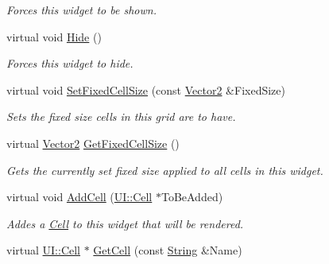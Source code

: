 \begin{DoxyCompactItemize}
\begin{DoxyCompactList}\small\item\em Forces this widget to be shown. \item\end{DoxyCompactList}\item 
\hypertarget{classphys_1_1UI_1_1CellGrid_a8f1ea23b55724f3346a6c32c87f4eabc}{
virtual void \hyperlink{classphys_1_1UI_1_1CellGrid_a8f1ea23b55724f3346a6c32c87f4eabc}{Hide} ()}
\label{d8/d59/classphys_1_1UI_1_1CellGrid_a8f1ea23b55724f3346a6c32c87f4eabc}

\begin{DoxyCompactList}\small\item\em Forces this widget to hide. \item\end{DoxyCompactList}\item 
virtual void \hyperlink{classphys_1_1UI_1_1CellGrid_ad8a6d111b1906b0eb165fcedc0917452}{SetFixedCellSize} (const \hyperlink{classphys_1_1Vector2}{Vector2} \&FixedSize)
\begin{DoxyCompactList}\small\item\em Sets the fixed size cells in this grid are to have. \item\end{DoxyCompactList}\item 
virtual \hyperlink{classphys_1_1Vector2}{Vector2} \hyperlink{classphys_1_1UI_1_1CellGrid_a7106972be4c03ac453894fcb7ef4782f}{GetFixedCellSize} ()
\begin{DoxyCompactList}\small\item\em Gets the currently set fixed size applied to all cells in this widget. \item\end{DoxyCompactList}\item 
virtual void \hyperlink{classphys_1_1UI_1_1CellGrid_ac4f29519b3e2bca1fa146b2a9a20ec61}{AddCell} (\hyperlink{classphys_1_1UI_1_1Cell}{UI::Cell} $\ast$ToBeAdded)
\begin{DoxyCompactList}\small\item\em Addes a \hyperlink{classphys_1_1UI_1_1Cell}{Cell} to this widget that will be rendered. \item\end{DoxyCompactList}\item 
virtual \hyperlink{classphys_1_1UI_1_1Cell}{UI::Cell} $\ast$ \hyperlink{classphys_1_1UI_1_1CellGrid_a563d2fcfdb017579633727094a3176f3}{GetCell} (const \hyperlink{namespacephys_aa03900411993de7fbfec4789bc1d392e}{String} \&Name)

\end{DoxyCompactItemize}
